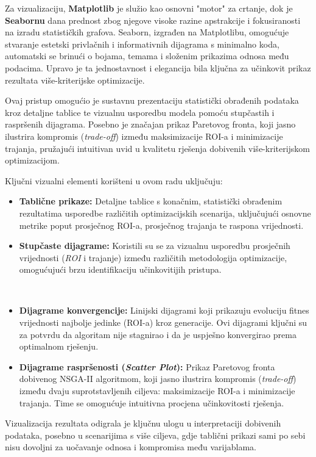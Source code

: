 Za vizualizaciju, \textbf{Matplotlib} je služio kao osnovni "motor" za crtanje, dok je \textbf{Seabornu} dana prednost zbog njegove visoke razine apstrakcije i fokusiranosti na izradu statističkih grafova. Seaborn, izgrađen na Matplotlibu, omogućuje stvaranje estetski privlačnih i informativnih dijagrama s minimalno koda, automatski se brinući o bojama, temama i složenim prikazima odnosa među podacima. Upravo je ta jednostavnost i elegancija bila ključna za učinkovit prikaz rezultata više-kriterijske optimizacije.

Ovaj pristup omogućio je sustavnu prezentaciju statistički obrađenih podataka kroz detaljne tablice te vizualnu usporedbu modela pomoću stupčastih i raspršenih dijagrama. Posebno je značajan prikaz Paretovog fronta, koji jasno ilustrira kompromis (\textit{trade-off}) između maksimizacije ROI-a i minimizacije trajanja, pružajući intuitivan uvid u kvalitetu rješenja dobivenih više-kriterijskom optimizacijom.

Ključni vizualni elementi korišteni u ovom radu uključuju:
\begin{itemize}
    \item \textbf{Tablične prikaze:} Detaljne tablice s konačnim, statistički obrađenim rezultatima usporedbe različitih optimizacijskih scenarija, uključujući osnovne metrike poput prosječnog ROI-a, prosječnog trajanja te raspona vrijednosti.
    \item \textbf{Stupčaste dijagrame:} Koristili su se za vizualnu usporedbu prosječnih vrijednosti (\textit{ROI} i trajanje) između različitih metodologija optimizacije, omogućujući brzu identifikaciju učinkovitijih pristupa.

   \item \textbf{Dijagrame konvergencije:} Linijski dijagrami koji prikazuju evoluciju fitnes vrijednosti najbolje jedinke (ROI-a) kroz generacije. Ovi dijagrami ključni su za potvrdu da algoritam nije stagnirao i da je uspješno konvergirao prema optimalnom rješenju.
    \item \textbf{Dijagrame raspršenosti (\textit{Scatter Plot}):} Prikaz Paretovog fronta dobivenog NSGA-II algoritmom, koji jasno ilustrira kompromis (\textit{trade-off}) između dvaju suprotstavljenih ciljeva: maksimizacije ROI-a i minimizacije trajanja. Time se omogućuje intuitivna procjena učinkovitosti rješenja.
\end{itemize}

Vizualizacija rezultata odigrala je ključnu ulogu u interpretaciji dobivenih podataka, posebno u scenarijima s više ciljeva, gdje tablični prikazi sami po sebi nisu dovoljni za uočavanje odnosa i kompromisa među varijablama.


